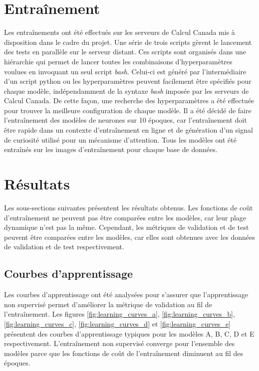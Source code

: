 \section{Entraînement}
    Les entraînements ont été effectués sur les serveurs de Calcul Canada mis à disposition dans le cadre du projet. Une série de trois scripts gèrent le lancement des tests en parallèle sur le serveur distant. Ces scripts sont organisés dans une hiérarchie qui permet de lancer toutes les combinaisons d'hyperparamètres voulues en invoquant un seul script \textit{bash}. Celui-ci est généré par l'intermédiaire d'un script python ou les hyperparamètres peuvent facilement être spécifiés pour chaque modèle, indépendamment de la syntaxe \textit{bash} imposée par les serveurs de Calcul Canada. De cette façon, une recherche des hyperparamètres a été effectuée pour trouver la meilleure configuration de chaque modèle.
    Il a été décidé de faire l'entraînement des modèles de neurones sur 10 époques, car l'entraînement doit être rapide dans un contexte d'entraînement en ligne et de génération d'un signal de curiosité utilisé pour un mécanisme d'attention. Tous les modèles ont été entraînés sur les images d'entraînement pour chaque base de données.
    
\section{Résultats}
    Les sous-sections suivantes présentent les résultats obtenus. Les fonctions de coût d'entraînement ne peuvent pas être comparées entre les modèles, car leur plage dynamique n'est pas la même. Cependant, les métriques de validation et de test peuvent être comparées entre les modèles, car elles sont obtenues avec les données de validation et de test respectivement.

\subsection{Courbes d'apprentissage}
    Les courbes d'apprentissage ont été analysées pour s'assurer que l'apprentissage non supervisé permet d'améliorer la métrique de validation au fil de l'entraînement. Les figures \ref{fig:learning_curves_a}, \ref{fig:learning_curves_b}, \ref{fig:learning_curves_c}, \ref{fig:learning_curves_d} et \ref{fig:learning_curves_e} présentent des courbes d'apprentissage typiques pour les modèles A, B, C, D et E respectivement. L'entraînement non supervisé converge pour l'ensemble des modèles parce que les fonctions de coût de l'entraînement diminuent au fil des époques.
    \bigskip

